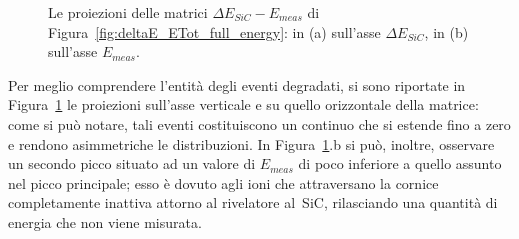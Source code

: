 \begin{figure} [!p]
	\centering
	
	\caption{Le proiezioni delle matrici $\Delta E_{SiC} - E_{meas}$ di Figura~\ref{fig:deltaE_ETot_full_energy}: in (a) sull'asse $\Delta E_{SiC}$, in (b) sull'asse $E_{meas}$.} \label{fig:fetta}
\end{figure}
Per meglio comprendere l'entità degli eventi degradati, si sono riportate in Figura~\ref{fig:fetta} le proiezioni sull'asse verticale e su quello orizzontale della matrice: come si può notare, tali eventi costituiscono un continuo che si estende fino a zero e rendono asimmetriche le distribuzioni. 
In Figura~\ref{fig:fetta}.b si può, inoltre, osservare un secondo picco situato ad un valore di $E_{meas}$ di poco inferiore a quello assunto nel picco principale; esso è dovuto agli ioni che attraversano la cornice completamente inattiva attorno al rivelatore al~SiC, rilasciando una quantità di energia che non viene misurata.





